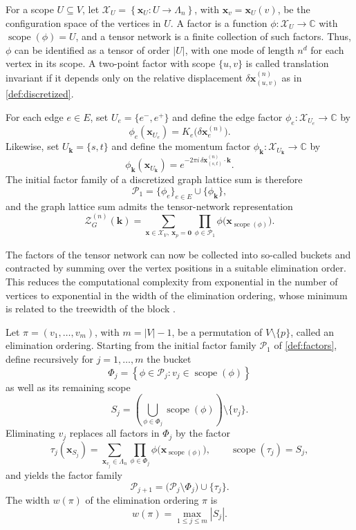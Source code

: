 \documentclass[]{amsart}
\numberwithin{mythm}{section}
\begin{document}
\begin{definition}
\label{def:factors}
For a scope $U\subseteq V$, let $\mathcal X_U
    =
    \left\{
        \bm x_U:U\to\Lambda_n
    \right\}$, with $\bm x_v=\bm x_U(v)$,
be the configuration space of the vertices in $U$. 
A factor is a function $\phi:\mathcal X_U\to\mathds C$ with
$\operatorname{scope}(\phi)=U$, and a tensor network is a finite collection of
such factors. Thus, $\phi$ can be identified as a tensor of order $|U|$, with one mode of length
$n^d$ for each vertex in its scope. A two-point factor with scope $\{u,v\}$ is
called translation invariant if it depends only on the relative displacement
$\delta\bm x^{(n)}_{(u,v)}$ as in \cref{def:discretized}.

For each edge $e\in E$, set $U_e=\{e^-,e^+\}$
and define the edge factor $\phi_e:\mathcal X_{U_e}\to\mathds C$ by
\[
    \phi_e(\bm x_{U_e})
    =
    K_e\bigl(\delta\bm x_e^{(n)}\bigr).
\]
Likewise, set $U_{\bm k}=\{s,t\}$
and define the momentum factor
$\phi_{\bm k}:\mathcal X_{U_{\bm k}}\to\mathds C$ by
\[
    \phi_{\bm k}(\bm x_{U_{\bm k}})
    =
    e^{-2\pi i\,\delta\bm x^{(n)}_{(s,t)}\cdot\bm k}.
\]
The initial factor family of a discretized graph lattice sum is therefore
\[
    \mathcal P_1
    =
    \{\phi_e\}_{e\in E}\cup\{\phi_{\bm k}\},
\]
and the graph lattice sum admits the tensor-network representation
\[
    \mathcal Z_G^{(n)}(\bm k)
    =
    \sum_{\bm x\in\mathcal X_V,\ \bm x_p=\bm 0}
    \prod_{\phi\in\mathcal P_1}
    \phi\bigl(\bm x_{\operatorname{scope}(\phi)}\bigr).
\]
\end{definition}

The factors of the tensor network can now be collected into so-called buckets and contracted by summing over the vertex positions in a suitable elimination order. This reduces the computational complexity from exponential in the number of vertices to exponential in the width of the elimination ordering, whose minimum is related to the treewidth of the block \cite{Dechter1999}.

\begin{definition}
\label{def:buckets}
Let $\pi=(v_1,\ldots,v_m)$, with $m=|V|-1$,
be a permutation of $V\setminus\{p\}$, called an elimination ordering.
Starting from the initial factor family $\mathcal P_1$ of
\cref{def:factors}, define recursively for $j=1,\ldots,m$ the bucket
\[
    \Phi_j
    =
    \left\{
        \phi\in\mathcal P_j:
        v_j\in\operatorname{scope}(\phi)
    \right\}
\]
as well as its remaining scope
\[
    S_j
    =
    \left(
        \bigcup_{\phi\in\Phi_j}
        \operatorname{scope}(\phi)
    \right)
    \setminus\{v_j\}.
\]
Eliminating $v_j$ replaces all factors in $\Phi_j$ by the factor
\[
    \tau_j(\bm x_{S_j})
    =
    \sum_{\bm x_{v_j}\in\Lambda_n}
    \prod_{\phi\in\Phi_j}
    \phi\bigl(\bm x_{\operatorname{scope}(\phi)}\bigr),
    \qquad
    \operatorname{scope}(\tau_j)=S_j,
\]
and yields the factor family
\[
    \mathcal P_{j+1}
    =
    \bigl(\mathcal P_j\setminus\Phi_j\bigr)
    \cup\{\tau_j\}.
\]
The width $w(\pi)$ of the elimination ordering $\pi$ is
\[
    w(\pi)
    =
    \max_{1\le j\le m}|S_j|.
\]
\end{definition}
\end{document}
